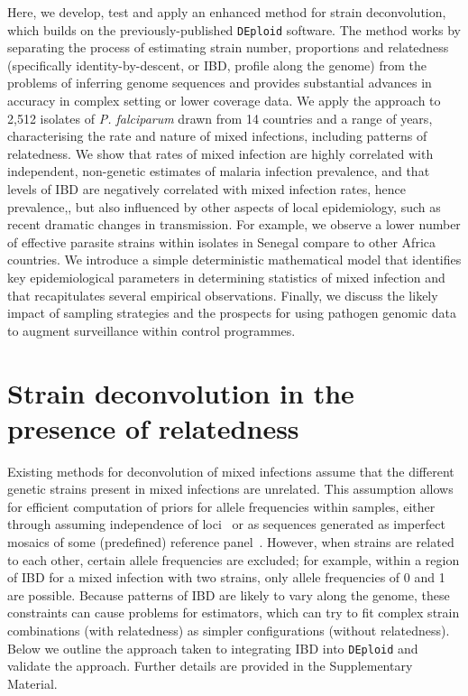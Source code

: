 \documentclass[9pt,lineno]{elife}
\begin{document}
Here, we develop, test and apply an enhanced method for strain deconvolution, which builds on the previously-published \texttt{DEploid} software.  The method works by separating the process of estimating strain number, proportions and relatedness (specifically identity-by-descent, or IBD, profile along the genome) from the problems of inferring genome sequences and provides substantial advances in accuracy in complex setting or lower coverage data.  We apply the approach to 2,512 isolates of {\it P. falciparum} drawn from 14 countries and a range of years, characterising the rate and nature of mixed infections, including patterns of relatedness.  We show that rates of mixed infection are highly correlated with independent, non-genetic estimates of malaria infection prevalence, and that levels of IBD are negatively correlated with mixed infection rates, hence prevalence,, but also influenced by other aspects of local epidemiology, such as recent dramatic changes in transmission. For example, we observe a lower number of effective parasite strains within isolates in Senegal compare to other Africa countries.  We introduce a simple deterministic mathematical model that identifies key epidemiological parameters in determining statistics of mixed infection and that recapitulates several empirical observations.  Finally, we discuss the likely impact of sampling strategies and the prospects for using pathogen genomic data to augment surveillance within control programmes.



\section{Strain deconvolution in the presence of relatedness}

Existing methods for deconvolution of mixed infections assume that the different genetic strains present in mixed infections are unrelated.  This assumption allows for efficient computation of priors for allele frequencies within samples, either through assuming independence of loci~\citep{Jack2016} or as sequences generated as imperfect mosaics of some (predefined) reference panel~\citep{Zhu2017}.  However, when strains are related to each other, certain allele frequencies are excluded; for example, within a region of IBD for a mixed infection with two strains, only allele frequencies of 0 and 1 are possible.  Because patterns of IBD are likely to vary along the genome, these constraints can cause problems for estimators, which can try to fit complex strain combinations (with relatedness) as simpler configurations (without relatedness).  Below we outline the approach taken to integrating IBD into \texttt{DEploid} and validate the approach.  Further details are provided in the Supplementary Material.
\end{document}
